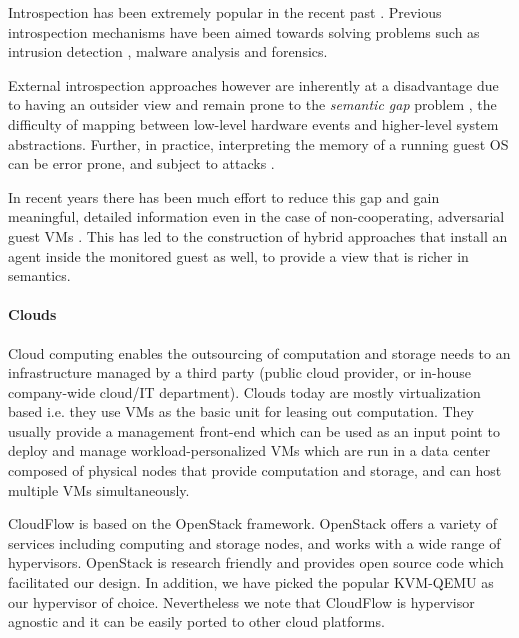 Introspection has been extremely popular in the recent past
\cite{RemoteAttestation,OutOfBox,OutOfBoxMalware,AntFarm,VMIObserve,TamperResist,libvmi}. 
Previous introspection mechanisms have been aimed towards solving problems such as intrusion detection \cite{CoPilot}, malware analysis
\cite{Ether} and forensics.  

External introspection approaches however are inherently at a disadvantage
due to having an outsider view and remain prone to the {\em semantic gap}
problem \cite{chen01virtual,SemanticGap}, the difficulty of mapping between
low-level hardware events and higher-level system abstractions.  Further, in
practice, interpreting the memory of a running guest OS can be error prone,
and subject to attacks \cite{DKSM}.

In recent years there has been much effort to reduce this gap and gain
meaningful, detailed information even in the case of non-cooperating,
adversarial guest VMs \cite{Virtuoso,ProcessImplanting}.  This has led to
the construction of hybrid approaches that install an agent inside the monitored
guest as well, to provide a view that is richer in semantics.

\paragraph{\bf Clouds}
% 
Cloud computing enables the outsourcing of computation and storage needs to
an infrastructure managed by a third party (public cloud provider, or
in-house company-wide cloud/IT department).  Clouds today are mostly
virtualization based i.e.  they use VMs as the basic unit for leasing out
computation.  They usually provide a management front-end which can be used
as an input point to deploy and manage workload-personalized VMs which are
run in a data center composed of physical nodes that provide
computation and storage, and can host multiple VMs simultaneously.  

CloudFlow is based on the OpenStack \cite{OpenStack} framework. OpenStack
offers a variety of services including computing and storage nodes, and
works with a wide range of hypervisors.  OpenStack is research friendly and
provides open source code which facilitated our design.  In addition, we
have picked the popular KVM-QEMU as our hypervisor of choice. Nevertheless we note that CloudFlow is hypervisor agnostic and it can be easily ported to other cloud platforms.


